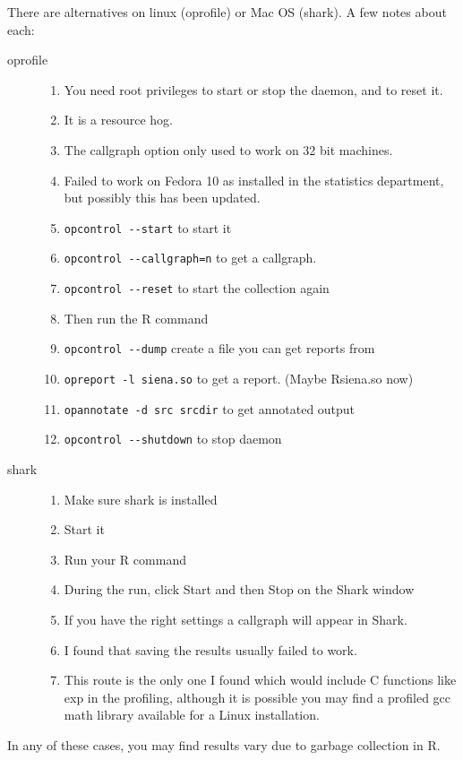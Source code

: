 \documentclass[12pt, a4paper]{article}
\renewcommand{\=}{\,=\,}
\newcommand{\+}{\,+\,}
\begin{document}
There are alternatives on linux (\textsf{oprofile}) or Mac OS (\textsf{shark}).
A few notes about each:
\begin{description}
\item[oprofile]
\begin{enumerate}
\item You need root privileges to start or stop the daemon, and to reset it.
\item It is a resource hog.
\item The callgraph option only used to work on 32 bit machines.
\item Failed to work on Fedora 10 as installed in the statistics department, but
  possibly this has been updated.
\item \verb|opcontrol --start| to start it
\item \verb|opcontrol --callgraph=n| to get a callgraph.
\item \verb|opcontrol --reset| to start the collection again
\item Then run the R command
\item \verb|opcontrol --dump| create a file you can get reports from
\item \verb|opreport -l siena.so| to get a report. (Maybe Rsiena.so now)
\item \verb|opannotate -d src srcdir| to get annotated output
\item \verb|opcontrol --shutdown| to stop daemon
\end{enumerate}
\item[shark]
\begin{enumerate}
\item Make sure shark is installed
\item Start it
\item Run your R command
\item During the run, click Start and then Stop  on the Shark window
\item If you have the right settings a callgraph will appear in Shark.
\item I found that saving the results usually failed to work.
\item This route is the only one I found which would include C functions like
  exp in the profiling, although it is possible you may find a profiled gcc
  math library available for a Linux installation.
\end{enumerate}
\end{description}

In any of these cases, you may find results vary due to garbage
collection in R.
\end{document}
